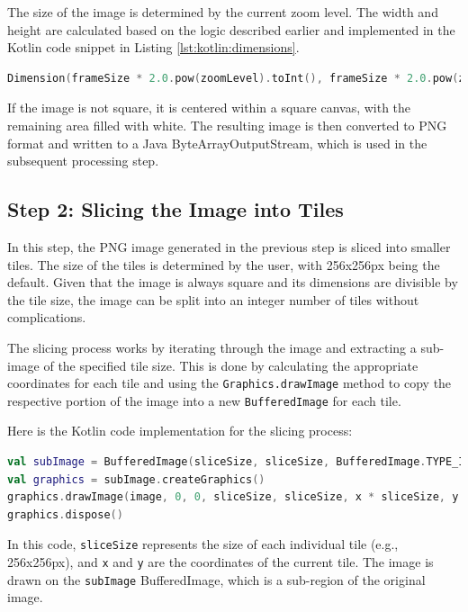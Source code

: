 The size of the image is determined by the current zoom level. The width and height are calculated based on the logic described earlier and implemented in the Kotlin code snippet in Listing \ref{lst:kotlin:dimensions}.

\begin{lstlisting}[language=Kotlin,caption=Image Dimensions Calculation,label=lst:kotlin:dimensions] 
Dimension(frameSize * 2.0.pow(zoomLevel).toInt(), frameSize * 2.0.pow(zoomLevel).toInt()) 
\end{lstlisting}

If the image is not square, it is centered within a square canvas, with the remaining area filled with white. The resulting image is then converted to PNG format and written to a Java ByteArrayOutputStream, which is used in the subsequent processing step.

\subsection{Step 2: Slicing the Image into Tiles}

In this step, the PNG image generated in the previous step is sliced into smaller tiles. The size of the tiles is determined by the user, with 256x256px being the default. Given that the image is always square and its dimensions are divisible by the tile size, the image can be split into an integer number of tiles without complications. 

The slicing process works by iterating through the image and extracting a sub-image of the specified tile size. This is done by calculating the appropriate coordinates for each tile and using the \texttt{Graphics.drawImage} method to copy the respective portion of the image into a new \texttt{BufferedImage} for each tile.

Here is the Kotlin code implementation for the slicing process:

\begin{lstlisting}[language=Kotlin,caption=Image Slicing Implementation,label=lst:kotlin:slicing]
val subImage = BufferedImage(sliceSize, sliceSize, BufferedImage.TYPE_INT_ARGB)
val graphics = subImage.createGraphics()
graphics.drawImage(image, 0, 0, sliceSize, sliceSize, x * sliceSize, y * sliceSize, (x + 1) * sliceSize, (y + 1) * sliceSize, null)
graphics.dispose()

\end{lstlisting}

In this code, \texttt{sliceSize} represents the size of each individual tile (e.g., 256x256px), and \texttt{x} and \texttt{y} are the coordinates of the current tile. The image is drawn on the \texttt{subImage} BufferedImage, which is a sub-region of the original image.

